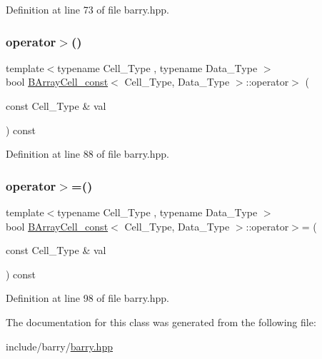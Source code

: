 Definition at line 73 of file barry.\+hpp.

\mbox{\label{classbarry_1_1_b_array_cell__const_a2cf1300cf2b4670fe735e718482f5791}} 
\subsubsection{\texorpdfstring{operator$>$()}{operator>()}}
{\footnotesize\ttfamily template$<$typename Cell\+\_\+\+Type , typename Data\+\_\+\+Type $>$ \\
bool \hyperlink{classbarry_1_1_b_array_cell__const}{B\+Array\+Cell\+\_\+const}$<$ Cell\+\_\+\+Type, Data\+\_\+\+Type $>$\+::operator$>$ (\begin{DoxyParamCaption}\item[{const Cell\+\_\+\+Type \&}]{val }\end{DoxyParamCaption}) const\hspace{0.3cm}{\ttfamily [inline]}}



Definition at line 88 of file barry.\+hpp.

\mbox{\label{classbarry_1_1_b_array_cell__const_af402da27396466b677cf4bcce94af6ed}} 
\subsubsection{\texorpdfstring{operator$>$=()}{operator>=()}}
{\footnotesize\ttfamily template$<$typename Cell\+\_\+\+Type , typename Data\+\_\+\+Type $>$ \\
bool \hyperlink{classbarry_1_1_b_array_cell__const}{B\+Array\+Cell\+\_\+const}$<$ Cell\+\_\+\+Type, Data\+\_\+\+Type $>$\+::operator$>$= (\begin{DoxyParamCaption}\item[{const Cell\+\_\+\+Type \&}]{val }\end{DoxyParamCaption}) const\hspace{0.3cm}{\ttfamily [inline]}}



Definition at line 98 of file barry.\+hpp.



The documentation for this class was generated from the following file\+:\begin{DoxyCompactItemize}
\item 
include/barry/\hyperlink{barry_8hpp}{barry.\+hpp}\end{DoxyCompactItemize}
